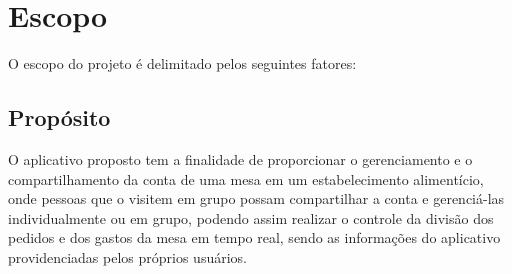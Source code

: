 \chapter{Escopo}\label{cap1}

O escopo do projeto é delimitado pelos seguintes fatores:

\section{Propósito}

O aplicativo proposto tem a finalidade de proporcionar o gerenciamento e o compartilhamento da conta de uma mesa em um estabelecimento alimentício, onde pessoas que o visitem em grupo possam compartilhar a conta e gerenciá-las individualmente ou em grupo, podendo assim realizar o controle da divisão dos pedidos e dos gastos da mesa em tempo real, sendo as informações do aplicativo providenciadas pelos próprios usuários.